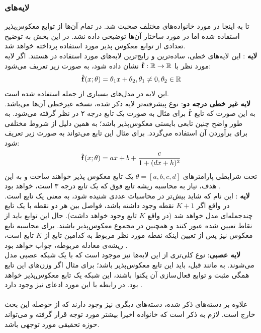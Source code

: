 \subsubsection{لایه‌های \coupling{}}
تا به اینجا در مورد خانواده‌های مختلف \normalizingflownets{} صحبت شد. در تمام آن‌ها از توابع معکوس‌پذیر استفاده شده اما در مورد ساختار آن‌ها توضیحی داده نشد. در این بخش به توضیح تعدادی از توابع معکوس پذیر مورد استفاده پرداخته خواهد شد.
\\
\textbf{لایه
	\coupling{} }:
این لایه‌های خطی، ساده‌ترین و رایج‌ترین لایه‌های مورد استفاده در \normalizingflownets{} هستند. اگر لایه مورد نظر با $\hat{{\bf f}}: {\mathbb{R}} \rightarrow {\mathbb{R}}$ نشان داده شود، به صورت زیر تعریف می‌شود:
\begin{align}
	\hat{{\bf f}} (x; \theta) = \theta_1 x + \theta_2, \theta_1 \neq 0, \theta_2 \in {\mathbb{R}}
\end{align}
این لایه در مدل‌های بسیاری از جمله \cite{iaf, maf} استفاده شده است.
\\
\textbf{لایه \coupling{}
	غیر خطی درجه دو}:
نوع پیشرفته‌تر لایه ذکر شده، نسخه غیرخطی آن‌ها می‌باشد. به این صورت که تابع $\hat{{\bf f}}$ برای مثال به صورت یک تابع درجه ۲ در نظر گرفته می‌شود. به طور واضح چنین تابعی بایستی معکوس‌پذیر باشد؛‌ به همین دلیل از شروط مختلفی برای برآوردن آن استفاده می‌گردد. برای مثال این تابع می‌تواند به صورت زیر تعریف شود:
\begin{align}
	\hat{{\bf f}}(x; \theta) = ax + b + \frac{c}{1 + (dx + h)^2}
\end{align}
تحت شرایطی پارامترهای $\theta=[a,b,c,d]$ یک تابع معکوس پذیر خواهند ساخت و به این هدف، نیاز به محاسبه ریشه تابع فوق که یک تابع درجه ۳ است، خواهد بود \cite{flow_survey}.
\\
\textbf{لایه \coupling{} \spline{}}:
این نام که شاید بیش‌تر در محاسبات عددی شنیده شود، به معنی یک تابع
است. در واقع اگر $K+1$ نقطه وجود داشته باشد، فواصل بین هر دو نقطه با یک تابع چندجمله‌ای مدل خواهد شد (در واقع $K$ تابع وجود خواهد داشت). حال این توابع باید از نقاط تعیین شده عبور کنند و همچنین در مجموع معکوس‌پذیر باشند. برای محاسبه تابع معکوس نیز پس از تعیین اینکه نقطه مورد نظر مربوط به کدامین تابع از $K$ تابع است، ریشه‌ی معادله مربوطه، جواب خواهد بود \cite{flow_survey}.
\\
\textbf{لایه \coupling{} عصبی}:
نوع کلی‌تری از این لایه‌ها نیز موجود است که با یک شبکه عصبی مدل می‌شوند. به مانند قبل،‌ باید این تابع معکوس‌پذیر باشد؛ برای مثال اگر وزن‌های این تابع همگی مثبت و توابع فعال‌سازی آن یکنوا باشند، این شبکه یک تابع معکوس‌پذیر خواهد بود. در رابطه با این مورد ادعای \univapprox{} نیز وجود دارد \cite{flow_survey}.
\\\\
علاوه بر دسته‌های ذکر شده، دسته‌های دیگری نیز وجود دارند که از حوصله این بحث خارج است. لازم به ذکر است که خانواده \normalizingflownets{} اخیرا بیشتر مورد توجه قرار گرفته و می‌تواند حوزه تحقیقی مورد توجهی باشد.
